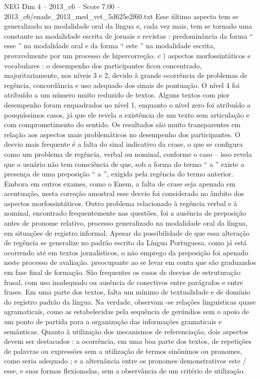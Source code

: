 \begin{textsample}{NEG Dim 4 – 2013\_c6 – Score 7.00 – 2013\_c6/enade\_2013\_med\_vet\_5d625e2f60.txt}
Esse último aspecto tem se generalizado na modalidade oral da língua e, cada vez mais, tem se tornado uma constante na modalidade escrita de jornais e revistas : predominância da forma “ esse ” na modalidade oral e da forma “ este ” na modalidade escrita, provavelmente por um processo de hipercorreção. c ) aspectos morfossintáticos e vocabulares : o desempenho dos participantes ficou concentrado, majoritariamente, nos níveis 3 e 2, devido à grande ocorrência de problemas de regência, concordância e uso adequado dos sinais de pontuação.
O nível 4 foi atribuído a um número muito reduzido de textos.
Alguns textos com pior desempenho foram enquadrados no nível 1, enquanto o nível zero foi atribuído a pouquíssimos casos, já que ele revela a existência de um texto sem articulação e com comprometimento do sentido.
Os resultados são muito transparentes em relação aos aspectos mais problemáticos no desempenho dos participantes.
O desvio mais frequente é a falta do sinal indicativo da crase, o que se configura como um problema de regência, verbal ou nominal, conforme o caso – isso revela que o usuário não tem consciência de que, sob a forma do termo “ a ” existe a presença de uma preposição “ a ”, exigida pela regência do termo anterior.
Embora em outros exames, como o Enem, a falta de crase seja apenada em acentuação, nesta correção amostral esse desvio foi considerado no âmbito dos aspectos morfossintáticos.
Outro problema relacionado à regência verbal e à nominal, encontrado frequentemente nas questões, foi a ausência de preposição antes de pronome relativo, processo generalizado na modalidade oral da língua, em situações de registro informal.
Apesar da possibilidade de que essa alteração de regência se generalize no padrão escrito da Língua Portuguesa, como já está ocorrendo até em textos jornalísticos, o não emprego da preposição foi apenado neste processo de avaliação. preocupante ao se levar em conta que são graduandos em fase final de formação.
São frequentes os casos de desvios de estruturação frasal, com uso inadequado ou ausência de conectivos entre parágrafos e entre frases.
Em uma parte dos textos, falta um mínimo de textualidade e de domínio do registro padrão da língua.
Na verdade, observam -se relações linguísticas quase agramaticais, como as estabelecidas pela sequência de gerúndios sem o apoio de um ponto de partida para a organização das informações gramaticais e semânticas.
Quanto à utilização dos mecanismos de referenciação, dois aspectos devem ser destacados : a ocorrência, em uma boa parte dos textos, de repetições de palavras ou expressões sem a utilização de termos sinônimos ou pronomes, como seria adequado ; e a alternância entre os pronomes demonstrativos este / esse, e suas formas flexionadas, sem a observância de um critério de utilização.

\end{textsample}
